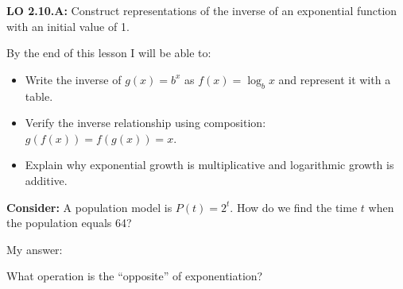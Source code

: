 \documentclass[10pt]{article}
\begin{document}
\namedateperiod

\vspace{0.1in}

\begin{objectivebox}
\textbf{LO 2.10.A:} Construct representations of the inverse of an exponential function with
an initial value of 1.

By the end of this lesson I will be able to:
\begin{itemize}[leftmargin=1.5em,itemsep=3pt,topsep=3pt]
  \item Write the inverse of $g(x)=b^x$ as $f(x)=\log_b x$ and represent it with a table.
  \item Verify the inverse relationship using composition: $g(f(x)) = f(g(x)) = x$.
  \item Explain why exponential growth is multiplicative and logarithmic growth is additive.
\end{itemize}
\end{objectivebox}

\vspace{0.08in}

\begin{vocabbox}





\end{vocabbox}

\vspace{0.08in}

\begin{hookbox}
\textbf{Consider:} A population model is $P(t) = 2^t$. How do we find the time $t$ when the
population equals 64?

\vspace{4pt}
My answer: 

\vspace{4pt}
What operation is the ``opposite'' of exponentiation? 
\end{hookbox}
\end{document}
